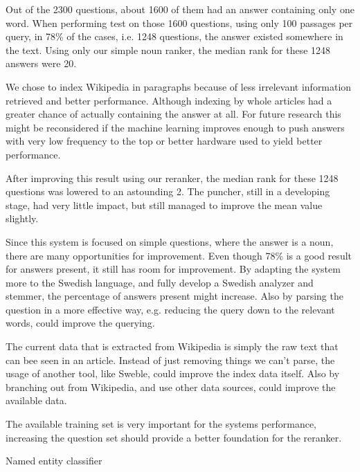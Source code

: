 Out of the 2300 questions, about 1600 of them had an answer containing only one word.
When performing test on those 1600 questions, using only 100 passages per query, 
in 78\% of the cases, i.e. 1248 questions, the answer existed somewhere in the text.
Using only our simple noun ranker, the median rank for these 1248 answers were 20.

We chose to index Wikipedia in paragraphs because of less irrelevant information retrieved and better performance. Although 
indexing by whole articles had a greater chance of actually containing the answer at all.
For future research this might be reconsidered if the machine learning improves enough to push answers with very low frequency to the
top or better hardware used to yield better performance.

After improving this result using our reranker, the median rank for these 1248 questions was lowered to an astounding 2.
The puncher, still in a developing stage, had very little impact, but still managed to improve the mean value slightly.

Since this system is focused on simple questions, where the answer is a noun, there are many opportunities for improvement.
Even though 78\% is a good result for answers present, it still has room for improvement. By adapting the system more to the Swedish language, 
and fully develop a Swedish analyzer and stemmer, the percentage of answers present might increase.
Also by parsing the question in a more effective way, e.g. reducing the query down to the relevant words, could improve the querying.

The current data that is extracted from Wikipedia is simply the raw text that can bee seen in an article. 
Instead of just removing things we can't parse, the usage of another tool, like Sweble, could improve the index data itself.
Also by branching out from Wikipedia, and use other data sources, could improve the available data.

The available training set is very important for the systems performance, increasing the question set should provide a better foundation for the reranker.

Named entity classifier


